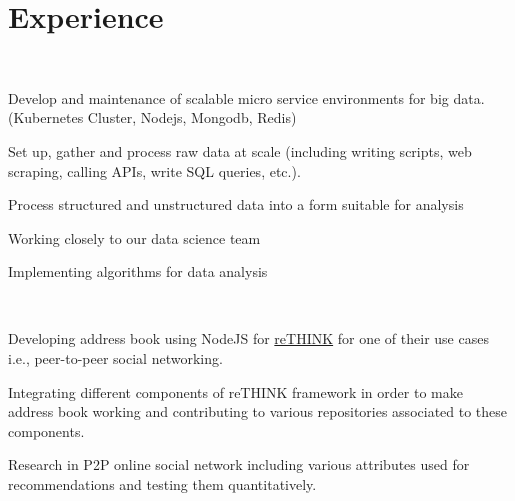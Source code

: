 \documentclass[]{hieudo-build}
\begin{document}
\begin{minipage}[t]{0.34\textwidth}

\sectionsep
{}

%
%
\end{minipage} 
\hfill
\begin{minipage}[t]{0.65\textwidth} 

\section{Experience}

\\
\vspace{0.9em} %
\begin{tightemize}
\item Develop and maintenance of scalable micro service environments for big data. (Kubernetes Cluster, Nodejs, Mongodb, Redis)
\item Set up, gather and process raw data at scale (including writing scripts, web scraping, calling APIs, write SQL queries, etc.).
\item Process structured and unstructured data into a form suitable for analysis 
\item Working closely to our data science team
\item Implementing algorithms for data analysis
\end{tightemize}
\sectionsep

\\
\vspace{0.9em} %
\begin{tightemize}
\item Developing address book using NodeJS for \href{https://rethink-project.eu/}{reTHINK} for one of their use cases i.e., peer-to-peer social networking.
\item Integrating different components of reTHINK framework in order to make address book working and contributing to various repositories associated to these components. 
\item Research in P2P online social network including various attributes used for recommendations and testing them quantitatively.
\end{tightemize}
\sectionsep


\end{minipage}
\end{document}
